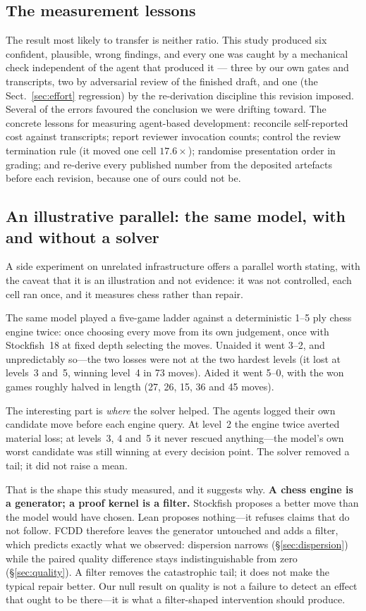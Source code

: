 \documentclass[runningheads]{llncs}
\begin{document}
\subsection{The measurement lessons}
The result most likely to transfer is neither ratio. This study produced six
confident, plausible, wrong findings, and every one was caught by a
mechanical check independent of the agent that produced it --- three by our
own gates and transcripts, two by adversarial review of the finished draft,
and one (the Sect.~\ref{sec:effort} regression) by the re-derivation
discipline this revision imposed. Several of the errors favoured the
conclusion we were drifting toward. The concrete lessons for measuring
agent-based development: reconcile self-reported cost against transcripts;
report reviewer invocation counts; control the review termination rule (it
moved one cell $17.6\times$); randomise presentation order in grading; and
re-derive every published number from the deposited artefacts before each
revision, because one of ours could not be.


\subsection{An illustrative parallel: the same model, with and without a solver}

A side experiment on unrelated infrastructure offers a parallel worth stating,
with the caveat that it is an illustration and not evidence: it was not
controlled, each cell ran once, and it measures chess rather than repair.

The same model played a five-game ladder against a deterministic 1--5 ply chess
engine twice: once choosing every move from its own judgement, once with
Stockfish~18 at fixed depth selecting the moves. Unaided it went 3--2, and
unpredictably so---the two losses were not at the two hardest levels (it lost at
levels~3 and~5, winning level~4 in 73 moves). Aided it went 5--0, with the won
games roughly halved in length (27, 26, 15, 36 and 45 moves).

The interesting part is \emph{where} the solver helped. The agents logged their
own candidate move before each engine query. At level~2 the engine twice averted
material loss; at levels~3, 4 and~5 it never rescued anything---the model's own
worst candidate was still winning at every decision point. The solver removed a
tail; it did not raise a mean.

That is the shape this study measured, and it suggests why. \textbf{A chess
engine is a generator; a proof kernel is a filter.} Stockfish proposes a better
move than the model would have chosen. Lean proposes nothing---it refuses claims
that do not follow. FCDD therefore leaves the generator untouched and adds a
filter, which predicts exactly what we observed: dispersion narrows
(\S\ref{sec:dispersion}) while the paired quality difference stays
indistinguishable from zero (\S\ref{sec:quality}). A filter removes the
catastrophic tail; it does not make the typical repair better. Our null result on
quality is not a failure to detect an effect that ought to be there---it is what
a filter-shaped intervention should produce.
\end{document}
